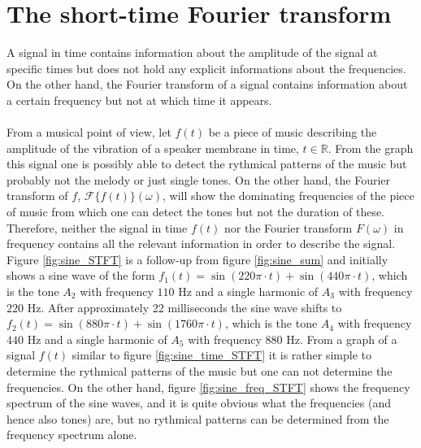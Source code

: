 \section{The short-time Fourier transform} \label{sec:STFT}
A signal in time contains information about the amplitude of the signal at specific times but does not hold any explicit informations about the frequencies. On the other hand, the Fourier transform of a signal contains information about a certain frequency but not at which time it appears.
\\ \\
From a musical point of view, let $f(t)$ be a piece of music describing the amplitude of the vibration of a speaker membrane in time, $t \in \mathbb{R}$. From the graph this signal one is possibly able to detect the rythmical patterns of the music but probably not the melody or just single tones. On the other hand, the Fourier transform of $f$, $\mathcal{F}\{f(t)\}(\omega)$, will show the dominating frequencies of the piece of music from which one can detect the tones but not the duration of these. Therefore, neither the signal in time $f(t)$ nor the Fourier transform $F(\omega)$ in frequency contains all the relevant information in order to describe the signal.
\\
Figure \ref{fig:sine_STFT} is a follow-up from figure \ref{fig:sine_sum} and initially shows a sine wave of the form $f_1(t) = \sin(220\pi\cdot t) + \sin(440\pi\cdot t)$, which is the tone $A_2$ with frequency $110$ Hz and a single harmonic of $A_3$ with frequency $220$ Hz. After approximately 22 milliseconds the sine wave shifts to $f_2(t) = \sin(880\pi\cdot t) + \sin(1760\pi\cdot t)$, which is the tone $A_4$ with frequency $440$ Hz and a single harmonic of $A_5$ with frequency $880$ Hz. From a graph of a signal $f(t)$ similar to figure \ref{fig:sine_time_STFT} it is rather simple to determine the rythmical patterns of the music but one can not determine the frequencies. On the other hand, figure \ref{fig:sine_freq_STFT} shows the frequency spectrum of the sine waves, and it is quite obvious what the frequencies (and hence also tones) are, but no rythmical patterns can be determined from the frequency spectrum alone.

